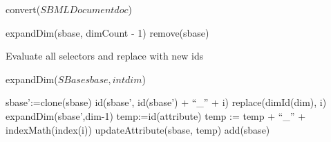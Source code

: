 %
%

\begin{algorithm}[ht]
  \caption{convert($SBMLDocument doc$)}

{
        expandDim(sbase, dimCount - 1)\;
        remove(sbase)\;
}

Evaluate all selectors and replace with new ids\;

\end{algorithm}

\begin{algorithm}[ht]
  \caption{expandDim($SBase sbase, int dim$)}

{
       {
                {
                        sbase':=clone(sbase)\;
                        id(sbase', id(sbase') + ``\_'' + i)\;
                        replace(dimId(dim), i)\;
                        expandDim(sbase',dim-1)\;
               }
     }
     \Else
     {
                {
                  temp:=id(attribute)\;
                        {
                          temp := temp + ``\_'' + indexMath(index(i))\;
                        }
                   updateAttribute(sbase, temp)\;
                   add(sbase)\;
                }
     }
}
\end{algorithm}
